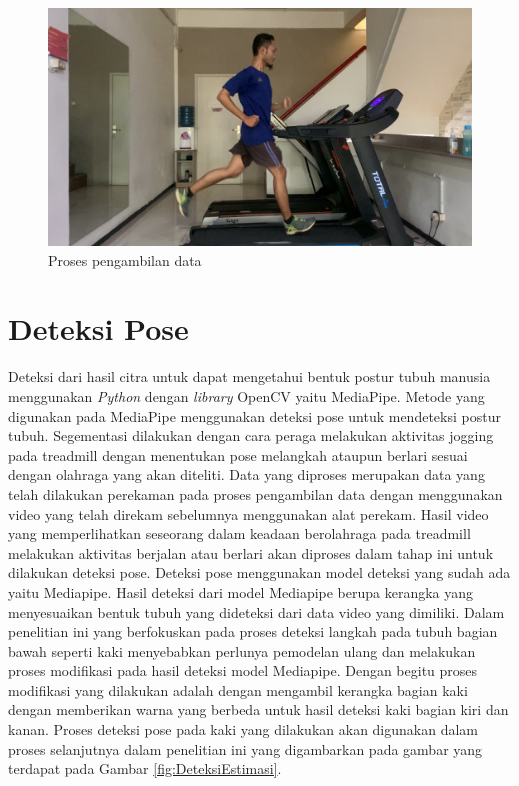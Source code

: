 \begin{figure}[H]
  \centering
  \includegraphics[scale=0.8]{gambar/pengambilan data.png}
  \caption{Proses pengambilan data}
  \label{fig:PengambilanData}
\end{figure}


\section{Deteksi Pose}
\label{sec:DeteksiPose}

Deteksi dari hasil citra untuk dapat mengetahui bentuk postur tubuh manusia menggunakan \emph{Python} dengan \emph{library} OpenCV yaitu MediaPipe. Metode yang digunakan pada MediaPipe menggunakan deteksi pose untuk mendeteksi postur tubuh. Segementasi dilakukan dengan cara peraga melakukan aktivitas jogging pada treadmill dengan menentukan pose melangkah ataupun berlari sesuai dengan olahraga yang akan diteliti. Data yang diproses merupakan data yang telah dilakukan perekaman pada proses pengambilan data dengan menggunakan video yang telah direkam sebelumnya menggunakan alat perekam. Hasil video yang memperlihatkan seseorang dalam keadaan berolahraga pada treadmill melakukan aktivitas berjalan atau berlari akan diproses dalam tahap ini untuk dilakukan deteksi pose. Deteksi pose menggunakan model deteksi yang sudah ada yaitu Mediapipe. Hasil deteksi dari model Mediapipe berupa kerangka yang menyesuaikan bentuk tubuh yang dideteksi dari data video yang dimiliki. Dalam penelitian ini yang berfokuskan pada proses deteksi langkah pada tubuh bagian bawah seperti kaki menyebabkan perlunya pemodelan ulang dan melakukan proses modifikasi pada hasil deteksi model Mediapipe. Dengan begitu proses modifikasi yang dilakukan adalah dengan mengambil kerangka bagian kaki dengan memberikan warna yang berbeda untuk hasil deteksi kaki bagian kiri dan kanan. Proses deteksi pose pada kaki yang dilakukan akan digunakan dalam proses selanjutnya dalam penelitian ini yang digambarkan pada gambar yang terdapat pada Gambar \ref{fig:DeteksiEstimasi}.

